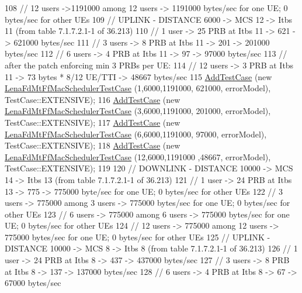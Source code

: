 \begin{DoxyCode}
108   \textcolor{comment}{// 12 users ->1191000 among 12 users -> 1191000 bytes/sec for one UE; 0 bytes/sec for other UEs}
109   \textcolor{comment}{// UPLINK - DISTANCE 6000 -> MCS 12 -> Itbs 11 (from table 7.1.7.2.1-1 of 36.213)}
110   \textcolor{comment}{// 1 user -> 25 PRB at Itbs 11 -> 621 -> 621000 bytes/sec}
111   \textcolor{comment}{// 3 users -> 8 PRB at Itbs 11 -> 201 -> 201000 bytes/sec}
112   \textcolor{comment}{// 6 users -> 4 PRB at Itbs 11 -> 97 -> 97000 bytes/sec}
113   \textcolor{comment}{// after the patch enforcing min 3 PRBs per UE:}
114   \textcolor{comment}{// 12 users -> 3 PRB at Itbs 11 -> 73 bytes * 8/12 UE/TTI -> 48667 bytes/sec}
115   \hyperlink{classns3_1_1TestCase_a3718088e3eefd5d6454569d2e0ddd835}{AddTestCase} (\textcolor{keyword}{new} \hyperlink{classLenaFdMtFfMacSchedulerTestCase}{LenaFdMtFfMacSchedulerTestCase} (1,6000,1191000,
      621000, errorModel), TestCase::EXTENSIVE);
116   \hyperlink{classns3_1_1TestCase_a3718088e3eefd5d6454569d2e0ddd835}{AddTestCase} (\textcolor{keyword}{new} \hyperlink{classLenaFdMtFfMacSchedulerTestCase}{LenaFdMtFfMacSchedulerTestCase} (3,6000,1191000,
      201000, errorModel), TestCase::EXTENSIVE);
117   \hyperlink{classns3_1_1TestCase_a3718088e3eefd5d6454569d2e0ddd835}{AddTestCase} (\textcolor{keyword}{new} \hyperlink{classLenaFdMtFfMacSchedulerTestCase}{LenaFdMtFfMacSchedulerTestCase} (6,6000,1191000,
      97000, errorModel), TestCase::EXTENSIVE);
118   \hyperlink{classns3_1_1TestCase_a3718088e3eefd5d6454569d2e0ddd835}{AddTestCase} (\textcolor{keyword}{new} \hyperlink{classLenaFdMtFfMacSchedulerTestCase}{LenaFdMtFfMacSchedulerTestCase} (12,6000,1191000
      ,48667, errorModel), TestCase::EXTENSIVE);
119 
120   \textcolor{comment}{// DOWNLINK - DISTANCE 10000 -> MCS 14 -> Itbs 13 (from table 7.1.7.2.1-1 of 36.213)}
121   \textcolor{comment}{// 1 user -> 24 PRB at Itbs 13 -> 775 -> 775000 byte/sec for one UE; 0 bytes/sec for other UEs}
122   \textcolor{comment}{// 3 users -> 775000 among 3 users -> 775000 bytes/sec for one UE; 0 bytes/sec for other UEs}
123   \textcolor{comment}{// 6 users -> 775000 among 6 users -> 775000 bytes/sec for one UE; 0 bytes/sec for other UEs}
124   \textcolor{comment}{// 12 users -> 775000 among 12 users -> 775000 bytes/sec for one UE; 0 bytes/sec for other UEs}
125   \textcolor{comment}{// UPLINK - DISTANCE 10000 -> MCS 8 -> Itbs 8 (from table 7.1.7.2.1-1 of 36.213)}
126   \textcolor{comment}{// 1 user -> 24 PRB at Itbs 8 -> 437 -> 437000 bytes/sec}
127   \textcolor{comment}{// 3 users -> 8 PRB at Itbs 8 -> 137 -> 137000 bytes/sec}
128   \textcolor{comment}{// 6 users -> 4 PRB at Itbs 8 -> 67 -> 67000 bytes/sec}

\end{DoxyCode}

